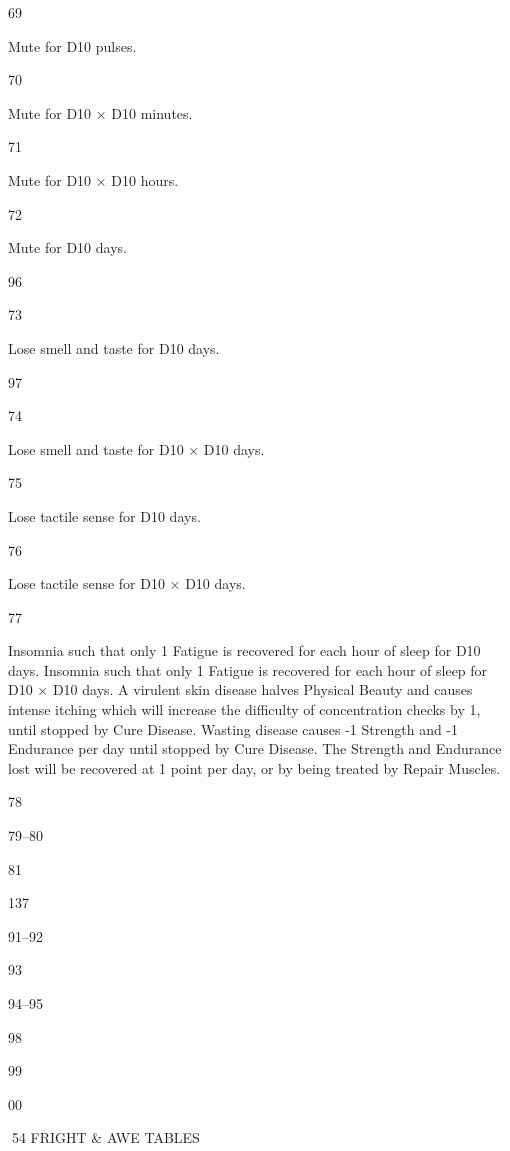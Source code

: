 \documentclass[a4paper]{article}
\begin{document}
\begin{multicols}{3}
69

Mute for D10 pulses.

70

Mute for D10 × D10 minutes.

71

Mute for D10 × D10 hours.

72

Mute for D10 days.

96

73

Lose smell and taste for D10 days.

97

74

Lose smell and taste for D10 × D10 days.

75

Lose tactile sense for D10 days.

76

Lose tactile sense for D10 × D10 days.

77

Insomnia such that only 1 Fatigue is recovered for each hour of sleep for D10
days.
Insomnia such that only 1 Fatigue is recovered for each hour of sleep for D10 ×
D10 days.
A virulent skin disease halves Physical
Beauty and causes intense itching which
will increase the difficulty of concentration checks by 1, until stopped by Cure
Disease.
Wasting disease causes -1 Strength and -1
Endurance per day until stopped by Cure
Disease. The Strength and Endurance lost
will be recovered at 1 point per day, or by
being treated by Repair Muscles.

78

79–80

81

137

91–92

93

94–95

98

99

00

54 FRIGHT & AWE TABLES


\end{multicols}
\end{document}
